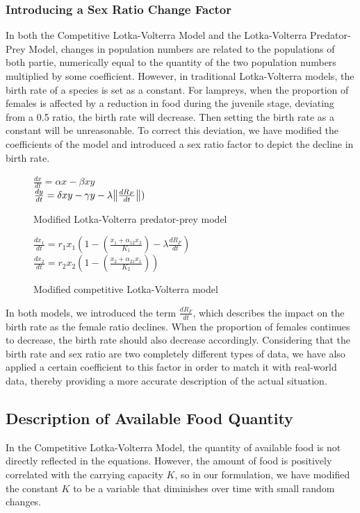 \documentclass[12pt]{article}
\begin{document}
\subsubsection{Introducing a Sex Ratio Change Factor}
In both the Competitive Lotka-Volterra Model and the Lotka-Volterra Predator-Prey Model, changes
in population numbers are related to the populations of both partie, numerically equal to the
quantity of the two population numbers multiplied by some coefficient. However, in traditional
Lotka-Volterra models, the birth rate of a species is set as a constant. For lampreys, when the
proportion of females is affected by a reduction in food during the juvenile stage, deviating
from a 0.5 ratio, the birth rate will decrease. Then setting the birth rate as a constant will
be unreasonable. To correct this deviation, we have modified the coefficients of the model and
introduced a sex ratio factor to depict the decline in birth rate.
\begin{figure}[h]
	\large
	\centering
	$\frac{dx}{dt}=\alpha x - \beta xy$ \\
	$\frac{dy}{dt}=\delta xy - \gamma y-\lambda \norm{\frac{dR_F}{dt}})$
	\caption*{Modified Lotka-Volterra predator-prey model}
\end{figure}

\begin{figure}[h]
	\large
	\centering
	$\frac{dx_1}{dt}=r_1x_1(1-(\frac{x_1+\alpha_{12}x_2}{K_1})- \lambda \frac{dR_F}{dt})$\\
	$\frac{dx_2}{dt}=r_2x_2(1-(\frac{x_2+\alpha_{21}x_1}{K_2}))$
	\caption*{Modified competitive Lotka-Volterra model}
\end{figure}
In both models, we introduced the term $\frac{dR_F}{dt}$, which describes the impact on the birth
rate as the female ratio declines. When the proportion of females continues to decrease, the
birth rate should also decrease accordingly. Considering that the birth rate and sex ratio are
two completely different types of data, we have also applied a certain coefficient to this factor
in order to match it with real-world data, thereby providing a more accurate description of the
actual situation.
\subsection*{Description of Available Food Quantity}
In the Competitive Lotka-Volterra Model, the quantity of available food is not directly reflected
in the equations. However, the amount of food is positively correlated with the carrying
capacity $K$, so in our formulation, we have modified the constant $K$ to be a variable that
diminishes over time with small random changes.
\end{document}
